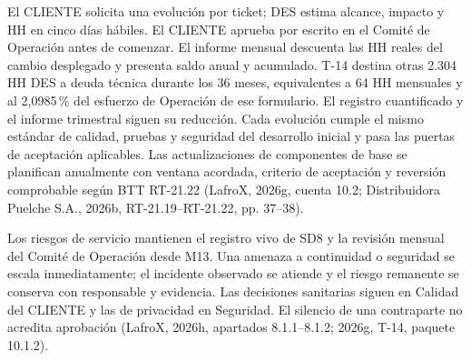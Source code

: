 El CLIENTE solicita una evolución por ticket; DES estima alcance, impacto y HH en cinco días hábiles. El CLIENTE aprueba por escrito en el Comité de Operación antes de comenzar. El informe mensual descuenta las HH reales del cambio desplegado y presenta saldo anual y acumulado. T-14 destina otras 2.304 HH DES a deuda técnica durante los 36 meses, equivalentes a 64 HH mensuales y al 2,0985\,\% del esfuerzo de Operación de ese formulario. El registro cuantificado y el informe trimestral siguen su reducción. Cada evolución cumple el mismo estándar de calidad, pruebas y seguridad del desarrollo inicial y pasa las puertas de aceptación aplicables. Las actualizaciones de componentes de base se planifican anualmente con ventana acordada, criterio de aceptación y reversión comprobable según BTT RT-21.22 (LafroX, 2026g, cuenta 10.2; Distribuidora Puelche S.A., 2026b, RT-21.19--RT-21.22, pp. 37--38).

Los riesgos de servicio mantienen el registro vivo de SD8 y la revisión mensual del Comité de Operación desde M13. Una amenaza a continuidad o seguridad se escala inmediatamente; el incidente observado se atiende y el riesgo remanente se conserva con responsable y evidencia. Las decisiones sanitarias siguen en Calidad del CLIENTE y las de privacidad en Seguridad. El silencio de una contraparte no acredita aprobación (LafroX, 2026h, apartados 8.1.1--8.1.2; 2026g, T-14, paquete 10.1.2).
